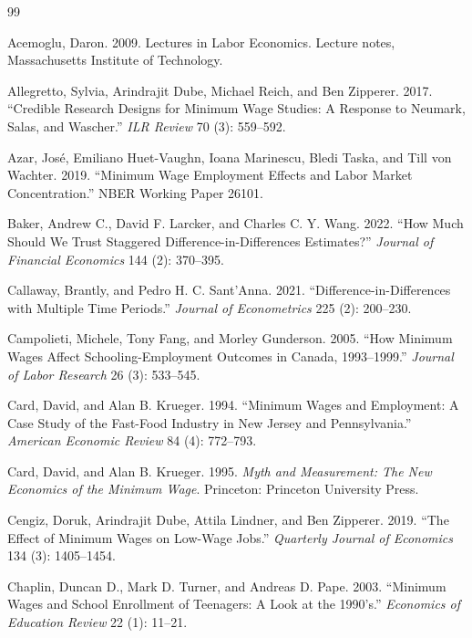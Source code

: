 \documentclass[12pt]{article}
\begin{document}
\clearpage

\begin{thebibliography}{99}

 Acemoglu, Daron. 2009. Lectures in Labor Economics. Lecture notes, Massachusetts Institute of Technology.

 Allegretto, Sylvia, Arindrajit Dube, Michael Reich, and Ben Zipperer. 2017. ``Credible Research Designs for Minimum Wage Studies: A Response to Neumark, Salas, and Wascher.'' \textit{ILR Review} 70 (3): 559--592.

 Azar, Jos\'e, Emiliano Huet-Vaughn, Ioana Marinescu, Bledi Taska, and Till von Wachter. 2019. ``Minimum Wage Employment Effects and Labor Market Concentration.'' NBER Working Paper 26101.

 Baker, Andrew C., David F. Larcker, and Charles C. Y. Wang. 2022. ``How Much Should We Trust Staggered Difference-in-Differences Estimates?'' \textit{Journal of Financial Economics} 144 (2): 370--395.

 Callaway, Brantly, and Pedro H. C. Sant'Anna. 2021. ``Difference-in-Differences with Multiple Time Periods.'' \textit{Journal of Econometrics} 225 (2): 200--230.

 Campolieti, Michele, Tony Fang, and Morley Gunderson. 2005. ``How Minimum Wages Affect Schooling-Employment Outcomes in Canada, 1993--1999.'' \textit{Journal of Labor Research} 26 (3): 533--545.

 Card, David, and Alan B. Krueger. 1994. ``Minimum Wages and Employment: A Case Study of the Fast-Food Industry in New Jersey and Pennsylvania.'' \textit{American Economic Review} 84 (4): 772--793.

 Card, David, and Alan B. Krueger. 1995. \textit{Myth and Measurement: The New Economics of the Minimum Wage}. Princeton: Princeton University Press.

 Cengiz, Doruk, Arindrajit Dube, Attila Lindner, and Ben Zipperer. 2019. ``The Effect of Minimum Wages on Low-Wage Jobs.'' \textit{Quarterly Journal of Economics} 134 (3): 1405--1454.

 Chaplin, Duncan D., Mark D. Turner, and Andreas D. Pape. 2003. ``Minimum Wages and School Enrollment of Teenagers: A Look at the 1990's.'' \textit{Economics of Education Review} 22 (1): 11--21.


\end{thebibliography}
\end{document}
